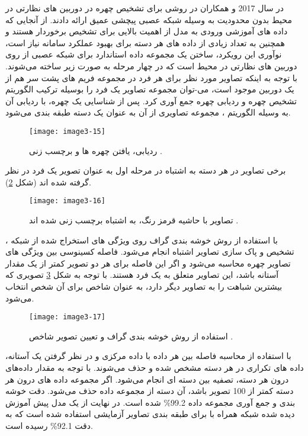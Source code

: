 \noindent
در سال 2017  و همکاران در \cite{7984553} روشی برای تشخیص چهره در دوربین های نظارتی در محیط بدون محدودیت به وسیله شبكه عصبی پیچشی عمیق ارائه دادند. از آنجایی که داده های آموزشی ورودی به مدل از اهمیت بالایی برای تشخیص برخوردار هستند و همچنین به تعداد زیادی از داده های هر دسته برای بهبود عملكرد سامانه نیاز است، نوآوری  این رویکرد، ساختن یک مجموعه داده استاندارد برای شبكه عصبی از روی دوربین های نظارتی در محیط است که در چهار مرحله به صورت زیر ساخته می‌شوند.
\noindent
با توجه به اینكه تصاویر مورد نظر برای هر فرد در مجموعه فریم های پشت سر هم از یک دوربین موجود است، می-توان مجموعه تصاویر یک فرد را بوسیله ترکیب الگوریتم تشخیص چهره و ردیابی چهره جمع آوری کرد. پس از شناسایی یک چهره، با ردیابی آن به وسیله الگوریتم ، مجموعه تصاویری از آن به عنوان یک دسته طبقه بندی می‌شود.

\begin{figure}[h]
\centering
  \texttt{[image: image3-15]}
  \caption{ردیابی، یافتن چهره ها و برچسب زنی \cite{7984553}.}
  \label{image2-1}
\end{figure}

\noindent
	برخی تصاویر در هر دسته به اشتباه در مرحله اول به عنوان تصویر یک فرد در نظر گرفته شده اند (شکل \ref{image3-16}).

\begin{figure}[h]
\centering
  \texttt{[image: image3-16]}
  \caption{تصاویر با حاشیه قرمز رنگ، به اشتباه برچسب زنی شده اند \cite{7984553}.}
  \label{image3-16}
\end{figure}

\noindent
با استفاده از روش خوشه بندی گراف  روی ویژگی های استخراج شده از شبكه ، تشخیص و پاک سازی تصاویر اشتباه انجام می‌شود. فاصله کسینوسی بین ویژگی های تصاویر چهره محاسبه می‌شود و اگر این فاصله برای هر دو تصویر کمتر از یک مقدار آستانه باشد، این تصاویر متعلق به یک فرد هستند. با توجه به شکل \ref{image3-17} تصویری که بیشترین شباهت را به تصاویر دیگر دارد، به عنوان شاخص برای آن شخص انتخاب می‌شود.

\begin{figure}[h]
\centering
  \texttt{[image: image3-17]}
  \caption{ استفاده از روش خوشه بندی گراف و تعیین تصویر شاخص \cite{7984553}.}
  \label{image3-17}
\end{figure}

\noindent
	با استفاده از محاسبه فاصله بین هر داده با داده مرکزی و در نظر گرفتن یک آستانه، داده های تكراری در هر دسته مشخص شده و حذف می‌شوند. با توجه به مقدار داده‌های درون هر دسته، تصفیه بین دسته ای انجام می‌شود. اگر مجموعه داده های درون هر دسته کمتر از 100 تصویر باشد، آن دسته از مجموعه داده حذف می‌شود. دقت خوشه بندی و جمع آوری مجموعه داده 99.2\% شده است. در نهایت از یک مدل پیش آموزش دیده شده شبكه  همراه با  برای طبقه بندی تصاویر آزمایشی استفاده شده است که به دقت 92.1\% رسیده است.

